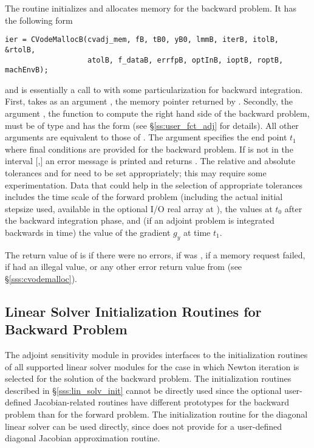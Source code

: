 The routine  initializes and allocates memory for the backward
problem. It has the following form
\begin{verbatim}
ier = CVodeMallocB(cvadj_mem, fB, tB0, yB0, lmmB, iterB, itolB, &rtolB, 
                   atolB, f_dataB, errfpB, optInB, ioptB, roptB, machEnvB);
\end{verbatim}
and is essentially a call to  with some particularization for 
backward integration. First,  takes as an argument 
, the memory pointer returned by .
Secondly, the argument , the {\C} function to compute the right hand side 
of the backward problem, must be of type  and
has the form  
(see \S\ref{ss:user_fct_adj} for details). 
All other arguments are equivalent to those of . The argument
 specifies the end point $t_1$ where final conditions are provided for
the backward problem. If  is not in the interval $[$,$]$
an error message is printed and  returns .
The relative and absolute tolerances  and  for  need
to be set appropriately; this may require some experimentation. Data that could
help in the selection of appropriate tolerances includes the time scale of the
forward problem (including the actual initial stepsize used, available in the
optional I/O real array at ), the  values at $t_0$ after
the backward integration phase, and (if an adjoint problem is integrated 
backwards in time) the value of the gradient $g_y$ at time $t_1$.

The return value of  is  if there were no errors,
 if  was , 
if a memory request failed,  if  had an illegal value,
or any other error return value from  (see \S\ref{sss:cvodemalloc}).

\subsection{Linear Solver Initialization Routines for Backward Problem}\label{sss:lin_solv_b}

The adjoint sensitivity module in {\cvodes} provides interfaces to the initialization
routines of all supported linear solver modules for the case in which Newton
iteration is selected for the solution of the backward problem. The initialization
routines described in \S\ref{sss:lin_solv_init} cannot be directly used since the
optional user-defined Jacobian-related routines have different prototypes for the
backward problem than for the forward problem. The initialization routine
 for the diagonal linear solver can be used directly, since {\cvdiag}
does not provide for a user-defined diagonal Jacobian approximation routine. 

